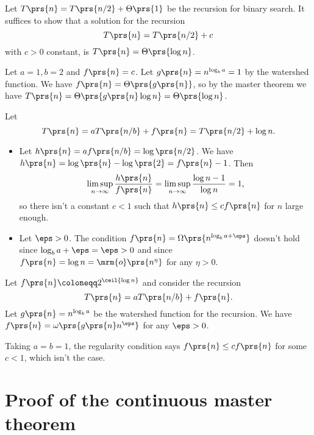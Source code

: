 \documentclass[oneside]{scrbook}
\theoremstyle{definition}
\begin{document}
\begin{exercise}
Let $T\prs{n} = T\prs{n/2} + \Theta\prs{1}$ be the recursion for binary search.
It suffices to show that a solution for the recursion
\[T\prs{n} = T\prs{n/2} + c\]
with $c > 0$ constant, is $T\prs{n} = \Theta\prs{\log n}$.

Let $a = 1, b = 2$ and $f\prs{n} = c$. Let $g\prs{n} = n^{\log_b a} = 1$ by the watershed function. We have $f\prs{n} = \Theta\prs{g\prs{n}}$, so by the master theorem we have $T\prs{n} = \Theta\prs{g\prs{n} \log n} = \Theta\prs{\log n}$.
\end{exercise}

\begin{exercise}
Let
\[T\prs{n} = a T\prs{n/b} + f\prs{n} = T\prs{n/2} + \log n \text{.}\]
\begin{itemize}
\item Let $h\prs{n} = a f\prs{n/b} = \log\prs{n/2}$. We have $h\prs{n} = \log\prs{n} - \log\prs{2} = f\prs{n} - 1$. Then \[\limsup_{n \to \infty} \frac{h\prs{n}}{f\prs{n}} = \limsup_{n\to\infty} \frac{\log n - 1}{\log n} = 1 \text{,}\] so there isn't a constant $c < 1$ such that $h\prs{n} \leq c f\prs{n}$ for $n$ large enough.

\item Let $\eps > 0$. The condition $f\prs{n} = \Omega\prs{n^{\log_b a + \eps}}$ doesn't hold since $\log_b a + \eps = \eps > 0$ and since $f\prs{n} = \log n = \mrm{o}\prs{n^\eta}$ for any $\eta > 0$.
\end{itemize}
\end{exercise}

\begin{exercise}
Let $f\prs{n} \coloneqq 2^{\ceil{\log n}}$ and consider the recursion
\[T\prs{n} = a T\prs{n/b} + f\prs{n} \text{.}\]
Let $g\prs{n} = n^{\log_b a}$ be the watershed function for the recursion.
We have $f\prs{n} = \omega\prs{g\prs{n} n^{\eps}}$ for any $\eps > 0$.

Taking $a = b = 1$, the regularity condition says $f\prs{n} \leq c f\prs{n}$ for some $c < 1$, which isn't the case.
\end{exercise}

\section{Proof of the continuous master theorem}
\end{document}
